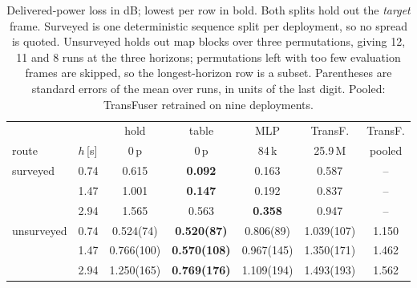 \begin{table}[t]
\centering
\setlength{\tabcolsep}{1.8pt}
\renewcommand{\arraystretch}{1.05}
\footnotesize
\begin{tabular}{llccccc}
\hline
\multicolumn{2}{c}{} & hold & table & MLP & TransF. & TransF.\\
route & $h$\,[s] & 0\,p & 0\,p & 84\,k & 25.9\,M & pooled\\
\hline
surveyed & 0.74 & 0.615 & \textbf{0.092} & 0.163 & 0.587 & --\\
 & 1.47 & 1.001 & \textbf{0.147} & 0.192 & 0.837 & --\\
 & 2.94 & 1.565 & 0.563 & \textbf{0.358} & 0.947 & --\\
\hline
unsurveyed & 0.74 & 0.524(74) & \textbf{0.520(87)} & 0.806(89) & 1.039(107) & 1.150\\
 & 1.47 & 0.766(100) & \textbf{0.570(108)} & 0.967(145) & 1.350(171) & 1.462\\
 & 2.94 & 1.250(165) & \textbf{0.769(176)} & 1.109(194) & 1.493(193) & 1.562\\
\hline
\end{tabular}
\caption{Delivered-power loss in dB; lowest per row in bold. Both splits hold out the
\emph{target} frame. Surveyed is one deterministic sequence split per deployment, so no
spread is quoted. Unsurveyed holds out map blocks over three permutations, giving 12, 11 and 8
runs at the three horizons; permutations left with too few evaluation frames are skipped, so
the longest-horizon row is a subset. Parentheses are standard errors of the mean over runs, in units of
the last digit. Pooled: TransFuser retrained on nine deployments.}
\label{tab:h2h}
\end{table}

